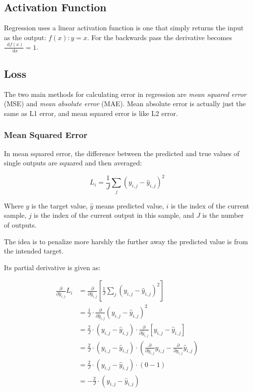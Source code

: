\documentclass[a4paper]{report}
\newcommand*\diff{\mathop{}\!\mathrm{d}}
\begin{document}
\subsection*{Activation Function}
Regression uses a linear activation function is one that simply returns the input as the output: $f(x): y=x$. For the backwards pass the derivative becomes $\frac{\diff f(x)}{\diff x} = 1$.

\subsection*{Loss}
The two main methods for calculating error in regression are \emph{mean squared error} (MSE) and \emph{mean absolute error} (MAE). Mean absolute error is actually just the same as L1 error, and mean squared error is like L2 error.

\subsubsection*{Mean Squared Error}
In mean squared error, the difference between the predicted and true values of single outputs are squared and then averaged:

\begin{equation*}
    L_i = \frac{1}{J} \sum_j (y_{i,j} - \hat{y}_{i,j})^2
\end{equation*}

Where $y$ is the target value, $\hat{y}$ means predicted value, $i$ is the index of the current sample, $j$ is the index of the current output in this sample, and $J$ is the number of outputs.

The idea is to penalize more harshly the further away the predicted value is from the intended target. 

Its partial derivative is given as:

\begin{align*}
    \frac{\partial}{\partial\hat{y}_{i,j}} L_i &= \frac{\partial}{\partial\hat{y}_{i,j}} \left[ \frac{1}{J}\sum_j(y_{i,j} - \hat{y}_{i,j})^2 \right] \\
    &= \frac{1}{J} \cdot \frac{\partial}{\partial\hat{y}_{i,j}}(y_{i,j} - \hat{y}_{i,j})^2 \\
    &= \frac{2}{J} \cdot (y_{i,j} - \hat{y}_{i,j}) \cdot \frac{\partial}{\partial\hat{y}_{i,j}}[y_{i,j}-\hat{y}_{i,j}] \\
    &= \frac{2}{J} \cdot (y_{i,j} - \hat{y}_{i,j}) \cdot (\frac{\partial}{\partial\hat{y}_{i,j}}y_{i,j} - \frac{\partial}{\partial\hat{y}_{i,j}}\hat{y}_{i,j}) \\
    &= \frac{2}{J} \cdot (y_{i,j} - \hat{y}_{i,j}) \cdot (0-1) \\
    &= -\frac{2}{J} \cdot (y_{i,j} - \hat{y}_{i,j})
\end{align*}
\end{document}
